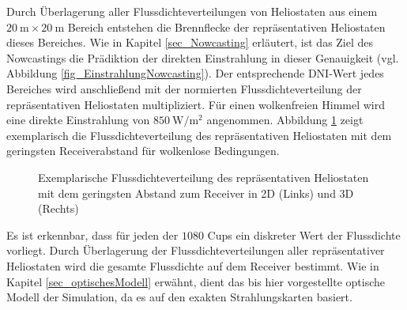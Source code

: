 Durch Überlagerung aller Flussdichteverteilungen von Heliostaten aus einem $\SI{20}{\metre} \times \SI{20}{\metre}$ Bereich entstehen die Brennflecke der repräsentativen Heliostaten dieses Bereiches.
Wie in Kapitel \ref{sec_Nowcasting} erläutert, ist das Ziel des Nowcastings die Prädiktion der direkten Einstrahlung in dieser Genauigkeit (vgl. Abbildung \ref{fig_EinstrahlungNowcasting}).
Der entsprechende DNI-Wert jedes Bereiches wird anschließend mit der normierten Flussdichteverteilung der repräsentativen Heliostaten multipliziert.
Für einen wolkenfreien Himmel wird eine direkte Einstrahlung von $\SI{850}{\watt\per\metre\squared}$ angenommen.
Abbildung \ref{fig_CasadiFluxmap} zeigt exemplarisch die Flussdichteverteilung des repräsentativen Heliostaten mit dem geringsten Receiverabstand für wolkenlose Bedingungen.

\begin{figure}[h!]
    \centering
    \setlength{\fboxsep}{1pt}
    \setlength{\fboxrule}{1pt}
    \caption[Exemplarische Flussdichteverteilung des repräsentativen Heliostaten mit dem geringsten Abstand zum Receiver in 2D und 3D]{Exemplarische Flussdichteverteilung des repräsentativen Heliostaten mit dem geringsten Abstand zum Receiver in 2D (Links) und 3D (Rechts)}
    \label{fig_CasadiFluxmap}
\end{figure}

Es ist erkennbar, dass für jeden der $1080$ Cups ein diskreter Wert der Flussdichte vorliegt.
Durch Überlagerung der Flussdichteverteilungen aller repräsentativer Heliostaten wird die gesamte Flussdichte auf dem Receiver bestimmt.
Wie in Kapitel \ref{sec_optischesModell} erwähnt, dient das bis hier vorgestellte optische Modell der Simulation, da es auf den exakten Strahlungskarten basiert.

